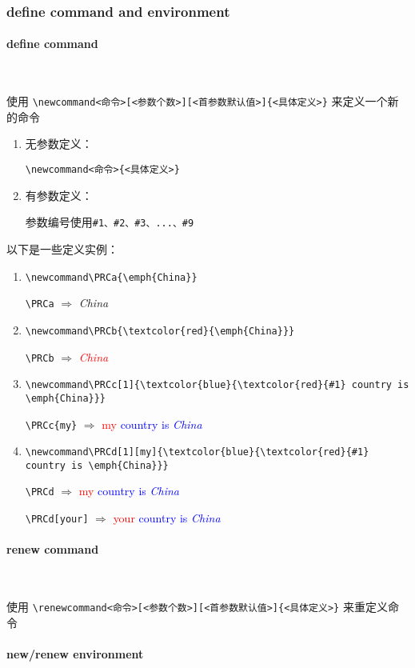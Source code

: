 
\subsubsection{define command and environment}

\paragraph{define command}~{}

使用 \verb=\newcommand<命令>[<参数个数>][<首参数默认值>]{<具体定义>}= 来定义一个新的命令
\begin{enumerate}[topsep=0pt,itemsep=0pt,parsep=0pt,leftmargin=3.6em,label=\arabic*>]
    \item 无参数定义：\par
        \verb=\newcommand<命令>{<具体定义>}= 
    \item 有参数定义：\par
        参数编号使用\verb=#1、#2、#3、...、#9=
\end{enumerate}

以下是一些定义实例：

\newcommand\PRCa{\emph{China}}
\newcommand\PRCb{\textcolor{red}{\emph{China}}}
\newcommand\PRCc[1]{\textcolor{blue}{\textcolor{red}{#1} country is \emph{China}}}
\newcommand\PRCd[1][my]{\textcolor{blue}{\textcolor{red}{#1} country is \emph{China}}}

\begin{enumerate}[topsep=0pt,itemsep=0pt,parsep=0pt,leftmargin=3.6em,label=\arabic*>]
    \item \verb=\newcommand\PRCa{\emph{China}}= \par
        \verb=\PRCa= $\Rightarrow$ \PRCa
    \item \verb=\newcommand\PRCb{\textcolor{red}{\emph{China}}}= \par
        \verb=\PRCb= $\Rightarrow$ \PRCb
    \item \verb=\newcommand\PRCc[1]{\textcolor{blue}{\textcolor{red}{#1} country is \emph{China}}}= \par
        \verb=\PRCc{my}= $\Rightarrow$ \PRCc{my}
    \item \verb=\newcommand\PRCd[1][my]{\textcolor{blue}{\textcolor{red}{#1} country is \emph{China}}}= \par
        \verb=\PRCd= $\Rightarrow$ \PRCd \par
        \verb=\PRCd[your]= $\Rightarrow$ \PRCd[your] \par
\end{enumerate}

\paragraph{renew command}~{}

使用 \verb=\renewcommand<命令>[<参数个数>][<首参数默认值>]{<具体定义>}= 来重定义命令

\paragraph{new/renew environment}~{}

